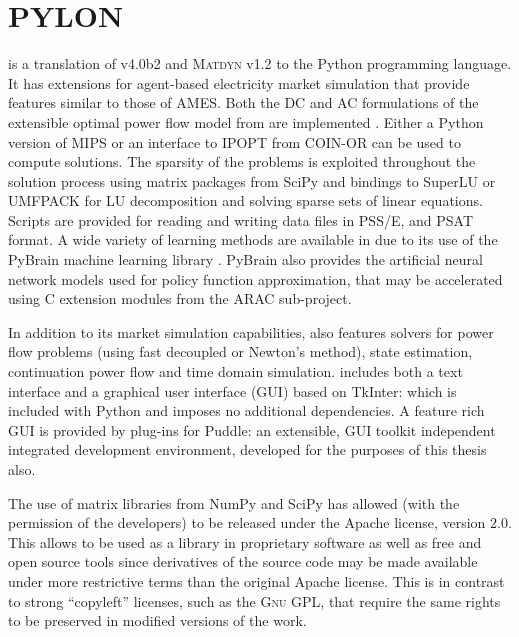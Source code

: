 \section{PYLON}
\label{sec:pylon}

\pylon is a translation of \matpower v4.0b2 and \textsc{Matdyn} v1.2 to the
Python programming language.  It has extensions for agent-based electricity
market simulation that provide features similar to those of AMES.  Both the DC
and AC formulations of the extensible optimal power flow model from \matpower
are implemented \cite{zimmerman:mp_pes}.  Either a Python version of MIPS or an
interface to IPOPT from COIN-OR can be used to compute solutions.  The sparsity
of the problems is exploited throughout the solution process using matrix
packages from SciPy and bindings to SuperLU or UMFPACK for LU decomposition and
solving sparse sets of linear equations. Scripts are provided for reading and
writing data files in PSS/E, \matpower and PSAT format. A wide variety of
learning methods are available in \pylon due to its use of the PyBrain machine
learning library \cite{schaul:2010}.  PyBrain also provides the artificial
neural network models used for policy function approximation, that may be
accelerated using C extension modules from the ARAC sub-project.

In addition to its market simulation capabilities, \pylon also features solvers
for power flow problems (using fast decoupled or Newton's method), state
estimation, continuation power flow and time domain simulation.  \pylon includes
both a text interface and a graphical user interface (GUI) based on TkInter:
which is included with Python and imposes no additional dependencies.  A feature
rich GUI is provided by plug-ins for Puddle: an extensible, GUI toolkit
independent integrated development environment, developed for the purposes of
this thesis also.

The use of matrix
libraries from NumPy and SciPy has allowed \pylon (with the permission of the
\matpower developers) to be released under the Apache license, version 2.0. This
allows \pylon to be used as a library in proprietary software as well as
free and open source tools since derivatives of the source code may be made
available under more restrictive terms than the original Apache license.  This
is in contrast to strong ``copyleft'' licenses, such as the \textsc{Gnu} GPL,
that require the same rights to be preserved in modified versions of the work.

